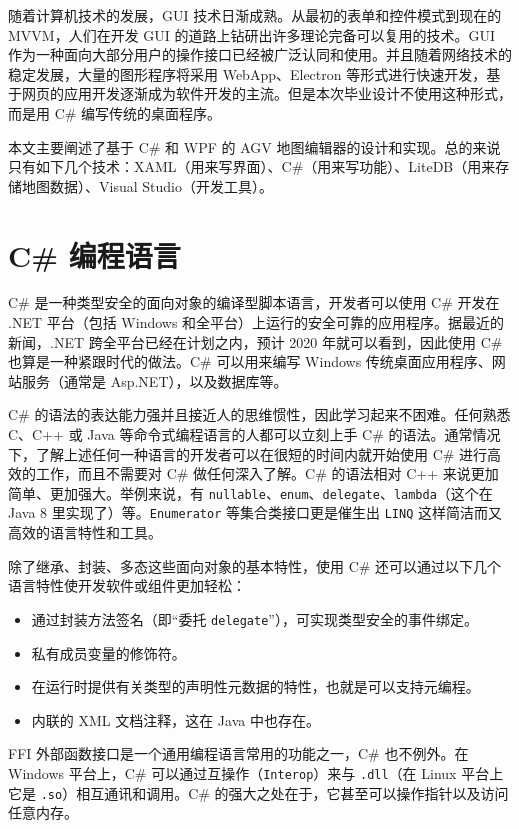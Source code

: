 
随着计算机技术的发展，GUI 技术日渐成熟。从最初的表单和控件模式到现在的 MVVM，人们在开发 GUI 的道路上钻研出许多理论完备可以复用的技术。GUI 作为一种面向大部分用户的操作接口已经被广泛认同和使用。并且随着网络技术的稳定发展，大量的图形程序将采用 WebApp、Electron 等形式进行快速开发，基于网页的应用开发逐渐成为软件开发的主流。但是本次毕业设计不使用这种形式，而是用 C\# 编写传统的桌面程序。

本文主要阐述了基于 C\# 和 WPF 的 AGV 地图编辑器的设计和实现。总的来说只有如下几个技术：XAML（用来写界面）、C\#（用来写功能）、LiteDB（用来存储地图数据）、Visual Studio（开发工具）。

\section{C\# 编程语言}

C\# 是一种类型安全的面向对象的编译型脚本语言，开发者可以使用 C\# 开发在 .NET 平台（包括 Windows 和全平台）上运行的安全可靠的应用程序。据最近的新闻，.NET 跨全平台已经在计划之内，预计 2020 年就可以看到，因此使用 C\# 也算是一种紧跟时代的做法。C\# 可以用来编写 Windows 传统桌面应用程序、网站服务（通常是 Asp.NET），以及数据库等。

C\# 的语法的表达能力强并且接近人的思维惯性，因此学习起来不困难。任何熟悉 C、C++ 或 Java 等命令式编程语言的人都可以立刻上手 C\# 的语法。通常情况下，了解上述任何一种语言的开发者可以在很短的时间内就开始使用 C\# 进行高效的工作，而且不需要对 C\# 做任何深入了解。C\# 的语法相对 C++ 来说更加简单、更加强大。举例来说，有 \texttt{nullable}、\texttt{enum}、\texttt{delegate}、\texttt{lambda}（这个在 Java 8 里实现了）等。\texttt{Enumerator} 等集合类接口更是催生出 \texttt{LINQ} 这样简洁而又高效的语言特性和工具。

除了继承、封装、多态这些面向对象的基本特性，使用 C\# 还可以通过以下几个语言特性使开发软件或组件更加轻松：

\begin{itemize}
  \item 通过封装方法签名（即``委托 \texttt{delegate}''），可实现类型安全的事件绑定。
  \item 私有成员变量的修饰符。
  \item 在运行时提供有关类型的声明性元数据的特性，也就是可以支持元编程。
  \item 内联的 XML 文档注释，这在 Java 中也存在。
\end{itemize}

FFI 外部函数接口是一个通用编程语言常用的功能之一，C\# 也不例外。在 Windows 平台上，C\# 可以通过互操作（\texttt{Interop}）来与 \texttt{.dll}（在 Linux 平台上它是 \texttt{.so}）相互通讯和调用。C\# 的强大之处在于，它甚至可以操作指针以及访问任意内存。

